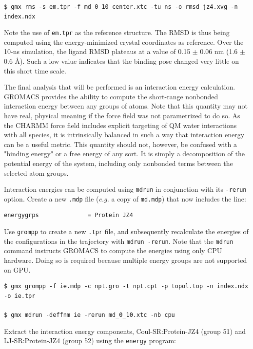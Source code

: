 \documentclass[9pt,tutorial,pubversion]{livecoms}
\begin{document}
\begin{lstlisting}
$ gmx rms -s em.tpr -f md_0_10_center.xtc -tu ns -o rmsd_jz4.xvg -n index.ndx
\end{lstlisting}
%
Note the use of \texttt{em.tpr} as the reference structure. The RMSD is thus being computed using the energy-minimized crystal coordinates as reference. Over the 10-ns simulation, the ligand RMSD plateaus at a value of 0.15 $\pm$ 0.06 nm (1.6 $\pm$ 0.6 \AA). Such a low value indicates that the binding pose changed very little on this short time scale.

The final analysis that will be performed is an interaction energy calculation. GROMACS provides the ability to compute the short-range nonbonded interaction energy between any groups of atoms. Note that this quantity may not have real, physical meaning if the force field was not parametrized to do so. As the CHARMM force field includes explicit targeting of QM water interactions with all species, it is intrinsically balanced in such a way that interaction energy can be a useful metric. This quantity should not, however, be confused with a "binding energy" or a free energy of any sort. It is simply a decomposition of the potential energy of the system, including only nonbonded terms between the selected atom groups.

Interaction energies can be computed using \texttt{mdrun} in conjunction with its \texttt{-rerun} option. Create a new \texttt{.mdp} file ({\em e.g.} a copy of \texttt{md.mdp}) that now includes the line:

\begin{lstlisting}
energygrps              = Protein JZ4
\end{lstlisting}

Use \texttt{grompp} to create a new \texttt{.tpr} file, and subsequently recalculate the energies of the configurations in the trajectory with \texttt{mdrun -rerun}. Note that the \texttt{mdrun} command instructs GROMACS to compute the energies using only CPU hardware. Doing so is required because multiple energy groups are not supported on GPU.

\begin{lstlisting}
$ gmx grompp -f ie.mdp -c npt.gro -t npt.cpt -p topol.top -n index.ndx -o ie.tpr

$ gmx mdrun -deffnm ie -rerun md_0_10.xtc -nb cpu
\end{lstlisting}

Extract the interaction energy components, Coul-SR:Protein-JZ4 (group 51) and LJ-SR:Protein-JZ4 (group 52) using the \texttt{energy} program:
\end{document}
